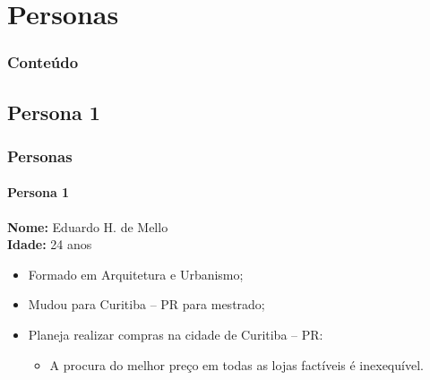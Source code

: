 \documentclass[14pt,beamer]{beamer}
\begin{document}
\section{Personas}

\begin{frame}
	\frametitle{Conteúdo}
    \begin{multicols}{2}
        \small
    \end{multicols}
\end{frame}
\subsection{Persona 1}

\begin{frame}
	\frametitle{Personas}
    \framesubtitle{Persona 1}

    \textbf{Nome:} Eduardo H. de Mello \\
    \textbf{Idade:} 24 anos \\

    \begin{itemize}
        \item Formado em Arquitetura e Urbanismo;
        \item Mudou para Curitiba -- PR para mestrado;
        \item Planeja realizar compras na cidade de Curitiba -- PR:
        \begin{itemize}
            \item A procura do melhor preço em todas as lojas factíveis
                é inexequível.
        \end{itemize}
    \end{itemize}
\end{frame}
\end{document}
